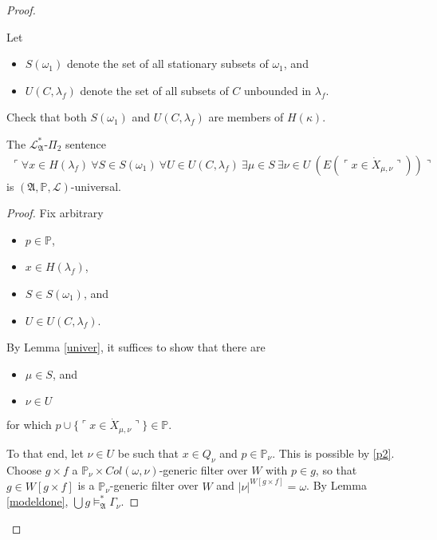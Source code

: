 \documentclass[12pt]{article}
\numberwithin{equation}{section}
\begin{document}
\begin{proof}
\begin{defi}\label{def423}
Let 
\begin{itemize}
    \item $S(\omega_1)$ denote the set of all stationary subsets of $\omega_1$, and
    \item $U(C, \lambda_f)$ denote the set of all subsets of $C$ unbounded in $\lambda_f$.
\end{itemize} 
\end{defi}

Check that both $S(\omega_1)$ and $U(C, \lambda_f)$ are members of $H(\kappa)$.

\begin{lem}\label{sideuni}
The $\mathcal{L}^*_{\mathfrak{A}}$-$\Pi_2$ sentence 
\begin{align}\label{c9}
    \ulcorner \forall x \in H(\lambda_f) \ \forall S \in S(\omega_1) \ \forall U \in U(C, \lambda_f) \ \exists \mu \in S \ \exists \nu \in U \ (E(\ulcorner x \in \dot{X}_{\mu, \nu} \urcorner)) \urcorner
\end{align} 
is $(\mathfrak{A}, \mathbb{P}, \mathcal{L})$-universal.
\end{lem}

\begin{proof}
Fix arbitrary
\begin{itemize}
    \item $p \in \mathbb{P}$,
    \item $x \in H(\lambda_f)$,
    \item $S \in S(\omega_1)$, and
    \item $U \in U(C, \lambda_f)$.
\end{itemize}
By Lemma \ref{univer}, it suffices to show that there are 
\begin{itemize}
    \item $\mu \in S$, and
    \item $\nu \in U$
\end{itemize} 
for which $p \cup \{\ulcorner x \in \dot{X}_{\mu, \nu} \urcorner\} \in \mathbb{P}$.

To that end, let $\nu \in U$ be such that $x \in Q_{\nu}$ and $p \in \mathbb{P}_{\nu}$. This is possible by \ref{p2}. Choose $g \times f$ a $\mathbb{P}_{\nu} \times Col(\omega, \nu)$-generic filter over $W$ with $p \in g$, so that $g \in W[g \times f]$ is a $\mathbb{P}_{\nu}$-generic filter over $W$ and $|\nu|^{W[g \times f]} = \omega$. By Lemma \ref{modeldone}, $\bigcup g \models^*_{\mathfrak{A}} \Gamma_{\nu}$.


\end{proof}
\end{proof}
\end{document}
